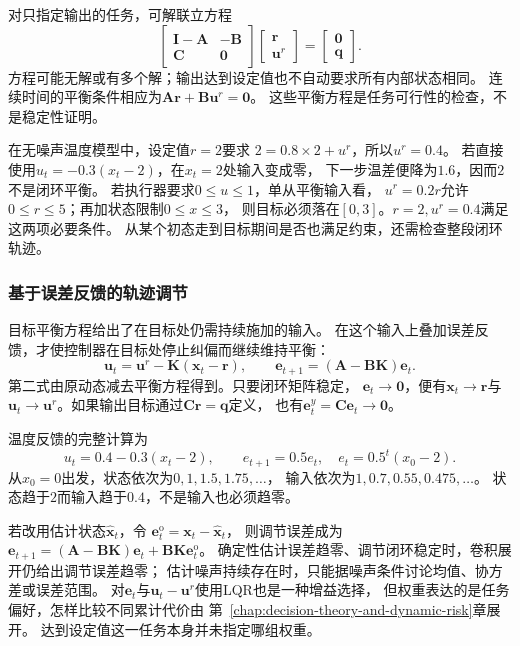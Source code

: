 对只指定输出的任务，可解联立方程
\[
  \begin{bmatrix}\bm I-\bm A&-\bm B\\\bm C&\bm0\end{bmatrix}
  \begin{bmatrix}\bm r\\\bm u^r\end{bmatrix}
  =\begin{bmatrix}\bm0\\\bm q\end{bmatrix}.
\]
方程可能无解或有多个解；输出达到设定值也不自动要求所有内部状态相同。
连续时间的平衡条件相应为$\bm A\bm r+\bm B\bm u^r=\bm0$。
这些平衡方程是任务可行性的检查，不是稳定性证明。

\begin{example}[非零温度需要维持输入]
\label{ex:control-temperature-equilibrium}
在无噪声温度模型中，设定值$r=2$要求
$2=0.8\times2+u^r$，所以$u^r=0.4$。
若直接使用$u_t=-0.3(x_t-2)$，在$x_t=2$处输入变成零，
下一步温差便降为$1.6$，因而$2$不是闭环平衡。
若执行器要求$0\leq u\leq1$，单从平衡输入看，
$u^r=0.2r$允许$0\leq r\leq5$；再加状态限制$0\leq x\leq3$，
则目标必须落在$[0,3]$。$r=2,u^r=0.4$满足这两项必要条件。
从某个初态走到目标期间是否也满足约束，还需检查整段闭环轨迹。
\end{example}

\subsubsection{基于误差反馈的轨迹调节}
目标平衡方程给出了在目标处仍需持续施加的输入。
在这个输入上叠加误差反馈，才使控制器在目标处停止纠偏而继续维持平衡：
\begin{equation}
  \bm u_t=\bm u^r-\bm K(\bm x_t-\bm r),
  \qquad
  \bm e_{t+1}=(\bm A-\bm B\bm K)\bm e_t.
  \label{eq:control-regulation-feedback}
\end{equation}
第二式由原动态减去平衡方程得到。只要闭环矩阵稳定，
$\bm e_t\to\bm0$，便有$\bm x_t\to\bm r$与
$\bm u_t\to\bm u^r$。如果输出目标通过$\bm C\bm r=\bm q$定义，
也有$\bm e_t^y=\bm C\bm e_t\to\bm0$。

温度反馈的完整计算为
\begin{equation}
  u_t=0.4-0.3(x_t-2),
  \qquad
  e_{t+1}=0.5e_t,\quad e_t=0.5^t(x_0-2).
  \label{eq:control-temperature-regulation}
\end{equation}
从$x_0=0$出发，状态依次为$0,1,1.5,1.75,\ldots$，
输入依次为$1,0.7,0.55,0.475,\ldots$。
状态趋于$2$而输入趋于$0.4$，不是输入也必须趋零。

若改用估计状态$\widehat{\bm x}_t$，令
$\bm e_t^{\mathrm o}=\bm x_t-\widehat{\bm x}_t$，
则调节误差成为
$\bm e_{t+1}=(\bm A-\bm B\bm K)\bm e_t+\bm B\bm K\bm e_t^{\mathrm o}$。
确定性估计误差趋零、调节闭环稳定时，卷积展开仍给出调节误差趋零；
估计噪声持续存在时，只能据噪声条件讨论均值、协方差或误差范围。
对$\bm e_t$与$\bm u_t-\bm u^r$使用LQR也是一种增益选择，
但权重表达的是任务偏好，怎样比较不同累计代价由
第~\ref{chap:decision-theory-and-dynamic-risk}章展开。
达到设定值这一任务本身并未指定哪组权重。

